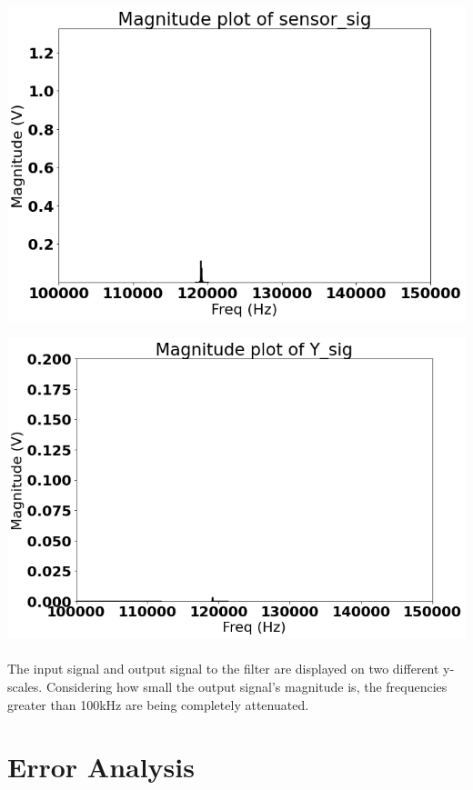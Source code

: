 \documentclass[12pt]{report}
\begin{document}
    \includegraphics[scale = 0.5]{Figure 2022-04-20 163927 (5).png}

    \includegraphics[scale = 0.5]{Figure 2022-04-20 163927 (16).png}
    
    \paragraph{} The input signal and output signal to the filter are displayed on two different y-scales. Considering how small the output signal's magnitude is, the frequencies greater than 100kHz are being completely attenuated.
    

\section{Error Analysis}

\end{document}
